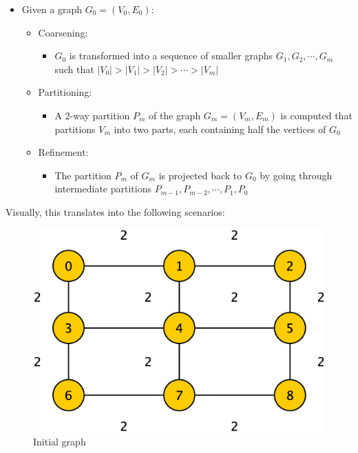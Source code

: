 \documentclass[abstract=on,9pt,twocolumn]{scrartcl}
\begin{document}
  \begin{itemize}
  \item Given a graph $G_0 = (V_0,E_0)$:
  \begin{itemize}    
    \item Coarsening:
    \begin{itemize}
      \item $G_0$ is transformed into a sequence of smaller graphs $G_1,G_2,\cdots,G_m$ such that $|V_0|>|V_1|>|V_2|>\cdots>|V_m|$
    \end{itemize}
    \item Partitioning: 
    \begin{itemize}
      \item A 2-way partition $P_m$ of the graph $G_m = (V_m,E_m)$ is computed that partitions $V_m$ into two parts, each containing half the vertices of $G_0$
    \end{itemize}
    \item Refinement:
    \begin{itemize}
      \item The partition $P_m$ of $G_m$ is projected back to $G_0$ by going through intermediate partitions $P_{m-1}, P_{m-2},\cdots,P_1,P_0$
    \end{itemize}
  \end{itemize}
\end{itemize}

Visually, this translates into the following scenarios:

\begin{center}
  \begin{figure}[htb]
    \includegraphics[width=\columnwidth]{img/coarsening.eps}
    \caption{Initial graph}
    \label{img:init_graph}
  \end{figure} 
\end{center}
\end{document}
